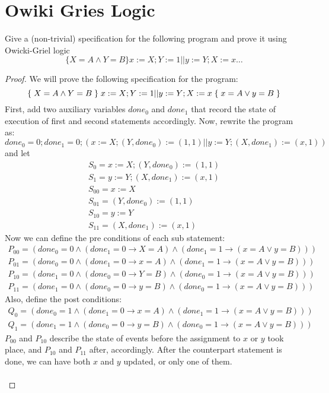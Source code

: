 \section{Owiki Gries Logic}
Give a (non-trivial) specification for the following program and prove it using Owicki-Griel logic
\begin{equation*}
	\{X=A\land Y=B\}x:=X;Y:=1 ||y :=Y; X:=x\ldots
\end{equation*}
\begin{proof}
We will prove the following specification for the program:
\begin{equation*}
	{\{\;X=A\land Y=B\;\}\;x:=X;Y:=1 || y:=Y;X:=x\;\{\;x=A\lor y=B\;\}}
\end{equation*}
First, add two auxiliary variables $done_0$ and $done_1$ that record the state of execution of first and second statements accordingly. Now, rewrite the program as:
\begin{equation*}
done_0=0;done_1=0;(x:=X;(Y,done_0):=(1,1) || y:=Y;(X,done_1):=(x,1))
\end{equation*}
and let
\begin{gather*}
S_0=x:=X;(Y,done_0):=(1,1)\\
S_1=y:=Y;(X,done_1):=(x,1)\\
S_{00}=x:=X\\
S_{01}=(Y,done_0):=(1,1)\\
S_{10}=y:=Y\\
S_{11}=(X,done_1):=(x,1)
\end{gather*}
Now we can define the pre conditions of each sub statement:
\begin{gather*}
P_{00}=(done_0=0\land (done_1=0\rightarrow X=A)\land (done_1=1\rightarrow (x=A\lor y=B))) \\
P_{01}=(done_0=0\land (done_1=0\rightarrow x=A)\land (done_1=1\rightarrow (x=A\lor y=B))) \\
P_{10}=(done_1=0\land (done_0=0\rightarrow Y=B)\land (done_0=1\rightarrow (x=A\lor y=B))) \\
P_{11}=(done_1=0\land (done_0=0\rightarrow y=B)\land (done_0=1\rightarrow (x=A\lor y=B)))
\end{gather*}
Also, define the post conditions:
\begin{gather*}
Q_{0}=(done_0=1\land (done_1=0\rightarrow x=A)\land (done_1=1\rightarrow (x=A\lor y=B))) \\
Q_{1}=(done_1=1\land (done_0=0\rightarrow y=B)\land (done_0=1\rightarrow (x=A\lor y=B)))
\end{gather*}
$P_{00}$ and $P_{10}$ describe the state of events before the assignment to $x$ or $y$ took place, and $P_{10}$ and $P_{11}$ after, accordingly. After the counterpart statement is done, we can have both $x$ and $y$ updated, or only one of them.\\ \\

\end{proof}
